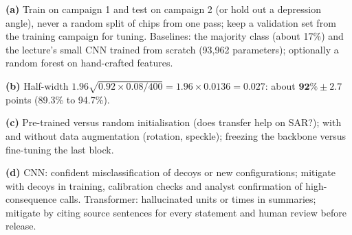 \documentclass[11pt]{article}
\begin{document}
\begin{soln}\textbf{(a)} Train on campaign 1 and test on campaign 2 (or hold out a depression angle), never a random split of chips from one pass; keep a validation set from the training campaign for tuning. Baselines: the majority class (about 17\%) and the lecture's small CNN trained from scratch (93,962 parameters); optionally a random forest on hand-crafted features.

\textbf{(b)} Half-width $1.96\sqrt{0.92\times0.08/400}=1.96\times0.0136=0.027$: about $\mathbf{92\%\pm2.7}$ points (89.3\% to 94.7\%).

\textbf{(c)} Pre-trained versus random initialisation (does transfer help on SAR?); with and without data augmentation (rotation, speckle); freezing the backbone versus fine-tuning the last block.

\textbf{(d)} CNN: confident misclassification of decoys or new configurations; mitigate with decoys in training, calibration checks and analyst confirmation of high-consequence calls. Transformer: hallucinated units or times in summaries; mitigate by citing source sentences for every statement and human review before release.\end{soln}
\end{document}
